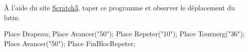 \begin{exercice}
    À l'aide du site 
   \href{https://scratch.mit.edu/projects/editor/?tutorial=getStarted}{Scratch3}, taper ce programme et
   observer le déplacement du lutin.

    \begin{Scratch}
        Place Drapeau;
        Place Avancer("50");
        Place Repeter("10");
        Place Tournerg("36");
        Place Avancer("50");
        Place FinBlocRepeter;
    \end{Scratch}
\end{exercice}